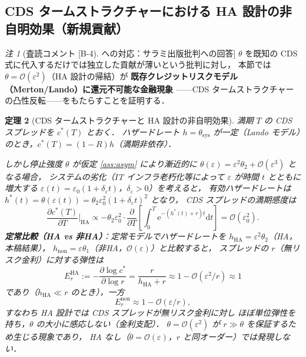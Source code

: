 \documentclass[12pt,a4paper]{article}
\theoremstyle{plain}
\newtheorem{theorem}{定理}[section]
\theoremstyle{definition}
\theoremstyle{remark}
\newtheorem{remark}[theorem]{注}
\newcommand{\calO}{\mathcal{O}}
\newcommand{\eps}{\varepsilon}
\newcommand{\e}{\mathrm{e}}
\newcommand{\dd}{\mathrm{d}}
\begin{document}
\subsection{CDS タームストラクチャーにおける HA 設計の非自明効果（新規貢献）}

\begin{remark}[査読コメント [B-4] への対応：サラミ出版批判への回答]
  $\theta$ を既知の CDS 式に代入するだけでは独立した貢献が薄いという批判に対し，
  本節では $\theta = \calO(\eps^2)$（HA 設計の帰結）が
  \textbf{既存クレジットリスクモデル（Merton/Lando）に還元不可能な金融現象}
  ——CDS タームストラクチャーの凸性反転——をもたらすことを証明する．
\end{remark}

\begin{theorem}[CDS タームストラクチャーと HA 設計の非自明効果]\label{thm:term_structure}
  満期 $T$ の CDS スプレッドを $c^*(T)$ とおく．
  ハザードレート $h = \theta_{\mathrm{sys}}$ が一定（Lando \cite{lando2004}
  モデル）のとき，$c^*(T) = (1-R)h$（満期非依存）．

  しかし停止強度 $\theta$ が仮定 \ref{ass:asym} により漸近的に
  $\theta(\eps) = \eps^2\theta_2 + \calO(\eps^3)$ となる場合，
  システムの劣化（IT インフラ老朽化等によって $\eps$ が時間 $t$ とともに増大する
  $\eps(t) = \eps_0(1+\delta_\eps t)$，$\delta_\eps>0$）を考えると，
  有効ハザードレートは $h^*(t) = \theta(\eps(t)) = \theta_2\eps_0^2(1+\delta_\eps t)^2$ となり，
  CDS スプレッドの満期感度は
  \begin{equation}\label{eq:term_struct}
    \frac{\partial c^*(T)}{\partial T}\bigg|_{\mathrm{HA}}
    \propto -\theta_2\eps_0^2 \cdot\frac{\partial}{\partial T}\!\left[
      \int_0^T\!\e^{-(h^*(t)+r)t}\dd t
    \right]
    = \calO(\eps_0^2).
  \end{equation}
  \textbf{定常比較（HA vs 非HA）}：定常モデルでハザードレートを
  $h_{\mathrm{HA}}=\eps^2\theta_2$（HA，本稿結果），
  $h_{\mathrm{non}}=\eps\theta_1$（非HA，$\calO(\eps)$）と比較すると，
  スプレッドの $r$（無リスク金利）に対する弾性は
  \begin{equation}\label{eq:elasticity}
    E^{\mathrm{HA}}_r := -\frac{\partial\log c^*}{\partial\log r} = \frac{r}{h_{\mathrm{HA}}+r}
    \approx 1 - \calO(\eps^2/r) \approx 1
  \end{equation}
  であり（$h_{\mathrm{HA}}\ll r$ のとき），一方
  \begin{equation}
    E^{\mathrm{non}}_r \approx 1 - \calO(\eps/r),
  \end{equation}
  すなわち HA 設計では CDS スプレッドが無リスク金利に対し\linebreak
  ほぼ単位弾性を持ち，$\theta$ の大小に感応しない（金利支配）．
  $\theta=\calO(\eps^2)$ が $r\gg\theta$ を保証するため生じる現象であり，
  HA なし（$\theta=\calO(\eps)$，$r$ と同オーダー）では発現しない．


\end{theorem}
\end{document}
